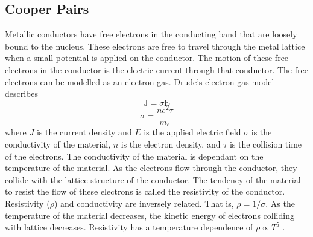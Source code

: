 \documentclass[letterpaper,english,reprint, aps]{revtex4}
\begin{document}
\subsection{Cooper Pairs}
Metallic conductors have free electrons in the conducting band that are loosely bound to the nucleus. These electrons are free to travel through the metal lattice when a small potential is applied on the conductor. The motion of these free electrons in the conductor is the electric current through that conductor. The free electrons can be modelled as an electron gas. Drude's electron gas model describes \citep{feynman}
\begin{equation}
    \label{ohms_law}
    \mathrm{J} = \sigma \mathrm{E}
\end{equation}
\begin{equation}
    \label{conductivity}
    \sigma = \frac{ne^2 \tau}{m_e}
\end{equation}
where $J$ is the current density and $E$ is the applied electric field $\sigma$ is the conductivity of the material, $n$ is the electron density, and $\tau$ is the collision time of the electrons. The conductivity of the material is dependant on the temperature of the material. As the electrons flow through the conductor, they collide with the lattice structure of the conductor. The tendency of the material to resist the flow of these electrons is called the resistivity of the conductor. Resistivity ($\rho$) and conductivity are inversely related. That is, $\rho = 1/\sigma$. As the temperature of the material decreases, the kinetic energy of electrons colliding with lattice decreases. Resistivity has a temperature dependence of $\rho \propto T^5$ \citep{cooper_pairs, vanduzer}.
\end{document}
